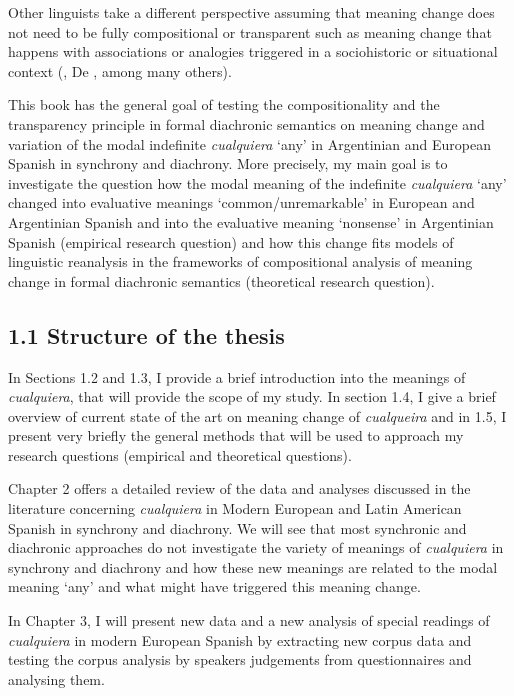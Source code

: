 \documentclass[output=paper]{langscibook}
\begin{document}
  Other linguists take a different perspective assuming that meaning change does not need to be fully compositional or transparent such as meaning change that happens with associations or analogies triggered in a sociohistoric or situational context (\citealt{CroftCruse2004}, De \citealt{SmetFischer2017}, among many others). 

  This book has the general goal of testing the compositionality and the transparency principle in formal diachronic semantics on meaning change and variation of the modal indefinite \textit{cualquiera} ‘any’ in Argentinian and European Spanish in synchrony and diachrony. More precisely, my main goal is to investigate the question how the modal meaning of the indefinite \textit{cualquiera} ‘any’ changed into evaluative meanings ‘common/unremarkable’ in European and Argentinian Spanish and into the evaluative meaning ‘nonsense’ in Argentinian Spanish (empirical research question) and how this change fits models of linguistic reanalysis in the frameworks of compositional analysis of meaning change in formal diachronic semantics (theoretical research question).

\subsection{1.1 Structure of the thesis}

In Sections 1.2 and 1.3, I provide a brief introduction into the meanings of \textit{cualquiera}, that will provide the scope of my study. In section 1.4, I give a brief overview of current state of the art on meaning change of \textit{cualqueira} and in 1.5, I present very briefly the general methods that will be used to approach my research questions (empirical and theoretical questions). 

  Chapter 2 offers a detailed review of the data and analyses discussed in the literature concerning \textit{cualquiera} in Modern European and Latin American Spanish in synchrony and diachrony. We will see that most synchronic and diachronic approaches do not investigate the variety of meanings of \textit{cualquiera} in synchrony and diachrony and how these new meanings are related to the modal meaning ‘any’ and what might have triggered this meaning change.

  In Chapter 3, I will present new data and a new analysis of special readings of \textit{cualquiera} in modern European Spanish by extracting new corpus data and testing the corpus analysis by speakers judgements from questionnaires and analysing them.
\end{document}
